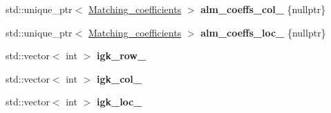 \begin{DoxyCompactItemize}
\item 
\hypertarget{classsirius_1_1_k__point_a5db081226b04df5a367c73e83220ab76}{}std\+::unique\+\_\+ptr$<$ \hyperlink{classsirius_1_1_matching__coefficients}{Matching\+\_\+coefficients} $>$ {\bfseries alm\+\_\+coeffs\+\_\+col\+\_\+} \{nullptr\}\label{classsirius_1_1_k__point_a5db081226b04df5a367c73e83220ab76}

\item 
\hypertarget{classsirius_1_1_k__point_adf90ee98b541e4b90acc9898c4a529e4}{}std\+::unique\+\_\+ptr$<$ \hyperlink{classsirius_1_1_matching__coefficients}{Matching\+\_\+coefficients} $>$ {\bfseries alm\+\_\+coeffs\+\_\+loc\+\_\+} \{nullptr\}\label{classsirius_1_1_k__point_adf90ee98b541e4b90acc9898c4a529e4}

\item 
\hypertarget{classsirius_1_1_k__point_a28715b2ca94b300b0e9c31f4adc09509}{}std\+::vector$<$ int $>$ {\bfseries igk\+\_\+row\+\_\+}\label{classsirius_1_1_k__point_a28715b2ca94b300b0e9c31f4adc09509}

\item 
\hypertarget{classsirius_1_1_k__point_ae68852b4bbf0a196a2060c2e867f32ee}{}std\+::vector$<$ int $>$ {\bfseries igk\+\_\+col\+\_\+}\label{classsirius_1_1_k__point_ae68852b4bbf0a196a2060c2e867f32ee}

\item 
\hypertarget{classsirius_1_1_k__point_aefa8a6ed74a91dcbafa2ed40b5ee762c}{}std\+::vector$<$ int $>$ {\bfseries igk\+\_\+loc\+\_\+}\label{classsirius_1_1_k__point_aefa8a6ed74a91dcbafa2ed40b5ee762c}


\end{DoxyCompactItemize}
